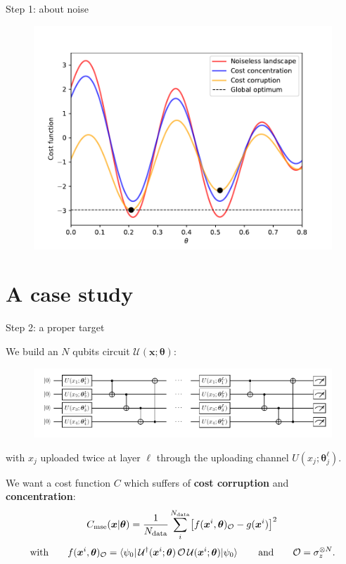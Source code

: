 \documentclass[8pt, xcolor={svgnames}, hyperref={linkcolor=black}]{beamer}
\newcommand{\equals}{=}
\begin{document}
\begin{frame}{Step 1: about noise}
\begin{figure}
\includegraphics[width=1\textwidth]{figures/corr.pdf}
\end{figure}
\end{frame}

\section{A case study}

\begin{frame}{Step 2: a proper target}
\pause
\begin{tcolorbox}[colback=red!20, title=\faCrosshairs\,\, $N$-dim fit: $y \equals g(\bm{x})$]
We build an $N$ qubits circuit $\mathcal{U}(\bm{x}; \bm{\theta})$:
\begin{figure}
\includegraphics[width=1\textwidth]{figures/circ.pdf}
\end{figure}
\vspace{-0.3cm}
with $x_j$ uploaded twice at layer $\ell$ through the uploading channel $U(x_j; \bm{\theta}_j^{\ell})$.
\end{tcolorbox}
\pause
\begin{tcolorbox}[colback=blue!20, title=\faPaypal\,\, Cost function]
We want a cost function $C$ which suffers of \textbf{cost corruption} and \textbf{concentration}:
$$ C_{\rm mse}(\bm{x}|\bm{\theta}) = \frac{1}{N_{\rm data}}\sum_i^{N_{\rm data}} 
  \bigl[ f(\bm{x}^i,\bm{\theta})_{\mathcal{O}} - g(\bm{x}^i) \bigr]^2 \, $$
$$ \text{with} \qquad 
  f(\bm{x}^i,\bm{\theta})_{\mathcal{O}} = \braket{\psi_0 |\, \mathcal{U}^{\dagger}(\bm{x}^i; \bm{\theta}) \,
  \mathcal{O} \, \mathcal{U}(\bm{x}^i; \bm{\theta})| \psi_0} \qquad \text{and} \qquad 
  \mathcal{O}=\sigma_z^{\otimes N}.$$
\end{tcolorbox}
\end{frame}
\end{document}

